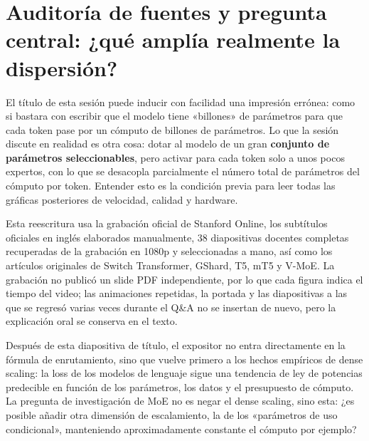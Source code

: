 \section{Auditoría de fuentes y pregunta central: ¿qué amplía realmente la dispersión?}

El título de esta sesión puede inducir con facilidad una impresión errónea: como si bastara con escribir que el modelo tiene «billones» de parámetros para que cada token pase por un cómputo de billones de parámetros. Lo que la sesión discute en realidad es otra cosa: dotar al modelo de un gran \textbf{conjunto de parámetros seleccionables}, pero activar para cada token solo a unos pocos expertos, con lo que se desacopla parcialmente el número total de parámetros del cómputo por token. Entender esto es la condición previa para leer todas las gráficas posteriores de velocidad, calidad y hardware.

Esta reescritura usa la grabación oficial de Stanford Online, los subtítulos oficiales en inglés elaborados manualmente, 38 diapositivas docentes completas recuperadas de la grabación en 1080p y seleccionadas a mano, así como los artículos originales de Switch Transformer, GShard, T5, mT5 y V-MoE. La grabación no publicó un slide PDF independiente, por lo que cada figura indica el tiempo del video; las animaciones repetidas, la portada y las diapositivas a las que se regresó varias veces durante el Q\&A no se insertan de nuevo, pero la explicación oral se conserva en el texto.


Después de esta diapositiva de título, el expositor no entra directamente en la fórmula de enrutamiento, sino que vuelve primero a los hechos empíricos de dense scaling: la loss de los modelos de lenguaje sigue una tendencia de ley de potencias predecible en función de los parámetros, los datos y el presupuesto de cómputo. La pregunta de investigación de MoE no es negar el dense scaling, sino esta: ¿es posible añadir otra dimensión de escalamiento, la de los «parámetros de uso condicional», manteniendo aproximadamente constante el cómputo por ejemplo?


